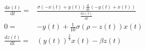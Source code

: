 \begin{align}
\frac{\mathrm{d} x\left( t \right)}{\mathrm{d}t} =& \frac{\sigma \left(  - x\left( t \right) + y\left( t \right) \right) \frac{\mathrm{d}}{\mathrm{d}t} \left(  - y\left( t \right) + x\left( t \right) \right)}{\frac{\mathrm{d} z\left( t \right)}{\mathrm{d}t}} \\
0 =&  - y\left( t \right) + \frac{1}{10} \sigma \left( \rho - z\left( t \right) \right) x\left( t \right) \\
\frac{\mathrm{d} z\left( t \right)}{\mathrm{d}t} =& \left( y\left( t \right) \right)^{\frac{2}{3}} x\left( t \right) - \beta z\left( t \right)
\end{align}
